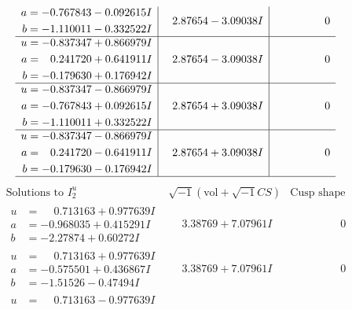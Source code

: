 \documentclass[1p]{elsarticle_modified}
\theoremstyle{definition}
\newcommand{\I}{\sqrt{-1}}
\begin{document}
$$\begin{array}{c|c|c}
\begin{aligned}
a &= -0.767843 - 0.092615 I \\
b &= -1.110011 - 0.332522 I\end{aligned}
 & \phantom{-}2.87654 - 3.09038 I & \phantom{-0.000000 } 0 \\ \hline\begin{aligned}
u &= -0.837347 + 0.866979 I \\
a &= \phantom{-}0.241720 + 0.641911 I \\
b &= -0.179630 + 0.176942 I\end{aligned}
 & \phantom{-}2.87654 - 3.09038 I & \phantom{-0.000000 } 0 \\ \hline\begin{aligned}
u &= -0.837347 - 0.866979 I \\
a &= -0.767843 + 0.092615 I \\
b &= -1.110011 + 0.332522 I\end{aligned}
 & \phantom{-}2.87654 + 3.09038 I & \phantom{-0.000000 } 0 \\ \hline\begin{aligned}
u &= -0.837347 - 0.866979 I \\
a &= \phantom{-}0.241720 - 0.641911 I \\
b &= -0.179630 - 0.176942 I\end{aligned}
 & \phantom{-}2.87654 + 3.09038 I & \phantom{-0.000000 } 0\\
 \hline 
 \end{array}$$\newpage$$\begin{array}{c|c|c}  
\text{Solutions to }I^u_{2}& \I (\text{vol} + \sqrt{-1}CS) & \text{Cusp shape}\\
 \hline 
\begin{aligned}
u &= \phantom{-}0.713163 + 0.977639 I \\
a &= -0.968035 + 0.415291 I \\
b &= -2.27874 + 0.60272 I\end{aligned}
 & \phantom{-}3.38769 + 7.07961 I & \phantom{-0.000000 } 0 \\ \hline\begin{aligned}
u &= \phantom{-}0.713163 + 0.977639 I \\
a &= -0.575501 + 0.436867 I \\
b &= -1.51526 - 0.47494 I\end{aligned}
 & \phantom{-}3.38769 + 7.07961 I & \phantom{-0.000000 } 0 \\ \hline\begin{aligned}
u &= \phantom{-}0.713163 - 0.977639 I \\

\end{aligned}
\end{array}$$
\end{document}
